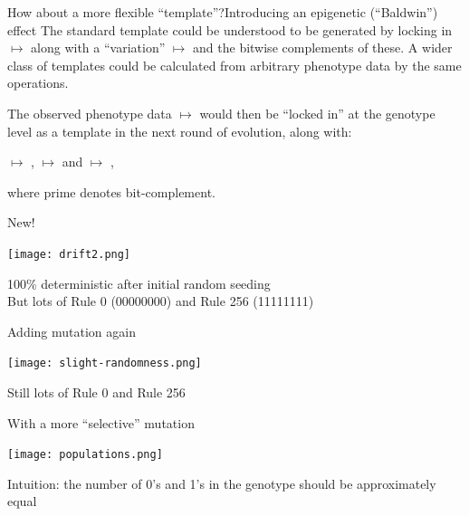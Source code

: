 \begin{frame}{How about a more flexible ``template''?}{Introducing an epigenetic (``Baldwin'') effect}
The standard template could be understood to be generated by locking in
%
\boxed{0\mystrut}\boxed{0\mystrut}\boxed{0\mystrut} $\mapsto$ \boxed{0\mystrut}
%
along with a ``variation''
\boxed{0\mystrut}\boxed{1\mystrut}\boxed{0\mystrut} $\mapsto$
\boxed{0\mystrut} and the bitwise complements of these.  A wider class of
templates could be calculated from arbitrary phenotype data by the same
operations. 

\medskip

The observed phenotype data
 $\mapsto$ 
would then be ``locked in'' at the genotype level as a template in the next round of evolution, along with:

\smallskip
{\centering
{} $\mapsto$ ,\quad
{} $\mapsto$ \quad
and\quad
{} $\mapsto$ , \par}
\smallskip

where prime denotes bit-complement.
\end{frame}

\begin{frame}{New!}{}
\begin{center}
\texttt{[image: drift2.png]}
\pause

100\% deterministic after initial random seeding\\
\pause
But lots of Rule 0 (00000000) and Rule 256 (11111111)
\end{center}
\end{frame}

\begin{frame}{Adding mutation again}{}
\begin{center}
\texttt{[image: slight-randomness.png]}
\pause

Still lots of Rule 0 and Rule 256
\end{center}
\end{frame}

\begin{frame}{With a more ``selective'' mutation}{}
\begin{center}
\texttt{[image: populations.png]}
\pause

Intuition: the number of 0's and 1's in the genotype should be approximately equal
\end{center}
\end{frame}

